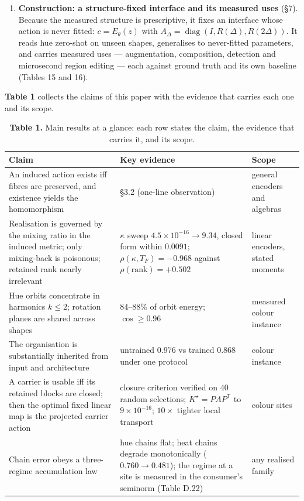 \begin{enumerate}
\item \textbf{Construction: a structure-fixed interface and its measured uses} (\S{}7). Because the measured structure is prescriptive, it fixes an interface whose action is never fitted: $c=E_\theta(z)$ with $A_\Delta=\operatorname{diag}(I,R(\Delta),R(2\Delta))$. It reads hue zero-shot on unseen shapes, generalises to never-fitted parameters, and carries measured uses --- augmentation, composition, detection and microsecond region editing --- each against ground truth and its own baseline (Tables 15 and 16).
\end{enumerate}

\textbf{Table 1} collects the claims of this paper with the evidence that carries each one and its scope.


\begin{table}[t]
\centering
\small
\caption*{\textbf{Table 1.} Main results at a glance: each row states the claim, the evidence that carries it, and its scope.}
\begin{tabularx}{\textwidth}{@{}>{\raggedright\arraybackslash}X >{\raggedright\arraybackslash}X >{\raggedright\arraybackslash}X@{}}
\toprule
\textbf{Claim} & \textbf{Key evidence} & \textbf{Scope} \\
\midrule
An induced action exists iff fibres are preserved, and existence yields the homomorphism & \S{}3.2 (one-line observation) & general encoders and algebras \\
Realisation is governed by the mixing ratio in the induced metric; only mixing-back is poisonous; retained rank nearly irrelevant & $\kappa$ sweep $4.5\times10^{-16}\to9.34$, closed form within $0.0091$; $\rho(\kappa,\allowbreak{}T_F)=-0.968$ against $\rho(\text{rank})=+0.502$ & linear encoders, stated moments \\
Hue orbits concentrate in harmonics $k\le2$; rotation planes are shared across shapes & $84$--$88\%$ of orbit energy; $\cos\ge0.96$ & measured colour instance \\
The organisation is substantially inherited from input and architecture & untrained $0.976$ vs trained $0.868$ under one protocol & colour instance \\
A carrier is usable iff its retained blocks are closed; then the optimal fixed linear map is the projected carrier action & closure criterion verified on 40 random selections; $K^\star=PAP^{\mathsf T}$ to $9\times10^{-16}$; $10\times$ tighter local transport & colour sites \\
Chain error obeys a three-regime accumulation law & hue chains flat; heat chains degrade monotonically ($0.760\to0.481$); the regime at a site is measured in the consumer's seminorm (Table D.22) & any realised family \\

\end{tabularx}
\end{table}
